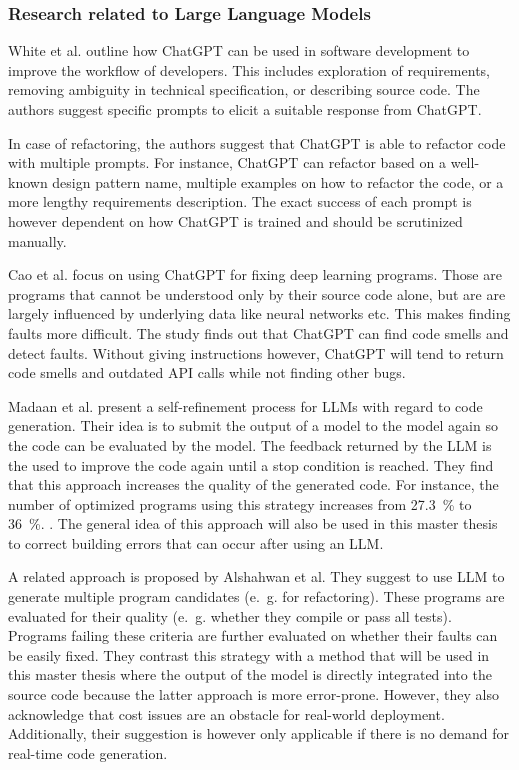 \subsubsection{Research related to Large Language Models}

White et al. \cite{White2024} outline how ChatGPT can be used in software development to improve the workflow of developers. This includes  exploration of requirements, removing ambiguity in technical specification, or describing source code. The authors suggest specific prompts to elicit a suitable response from ChatGPT.

In case of refactoring, the authors suggest that ChatGPT is able to refactor code with multiple prompts. For instance, ChatGPT can refactor based on a well-known design pattern name, multiple examples on how to refactor the code, or a more lengthy requirements description. The exact success of each prompt is however dependent on how ChatGPT is trained and should be scrutinized manually. 

Cao et al. \cite{cao2023study} focus on using ChatGPT for fixing deep learning programs. Those are programs that cannot be understood only by their source code alone, but are are largely influenced by underlying data like  neural networks etc. This makes finding faults more difficult. The study finds out that ChatGPT can find code smells and detect faults. Without giving instructions however, ChatGPT will tend to return code smells and outdated API calls while not finding other bugs. 


Madaan et al. present a self-refinement process for \acp{LLM} with regard to code generation. Their idea is to submit the output of a model to the model again so the code can be evaluated by the model. The feedback returned by the \ac{LLM} is the used to improve the code again until a stop condition is reached. They find that this approach increases the quality of the generated code. For instance, the number of optimized programs using this strategy increases from 27.3~\% to 36~\%. \cite{Madaan2023SelfRefineIR}. 
The general idea of this approach will also be used in this master thesis to correct building errors that can occur after using an \ac{LLM}. 

A related approach is proposed by Alshahwan et al. They suggest to use \ac{LLM} to generate multiple program candidates (e.~g. for refactoring). These programs are evaluated for their quality (e.~g. whether they compile or pass all tests). Programs failing these criteria are further evaluated on whether their faults can be easily fixed. They contrast this strategy with a method that will be used in this master thesis where the output of the model is directly integrated into the source code because the latter approach is more error-prone. However, they also acknowledge that cost issues are an obstacle for real-world deployment.
Additionally, their suggestion is however only applicable if there is no demand for real-time code generation. \cite{alshahwan2024assuredllmbasedsoftwareengineering}


